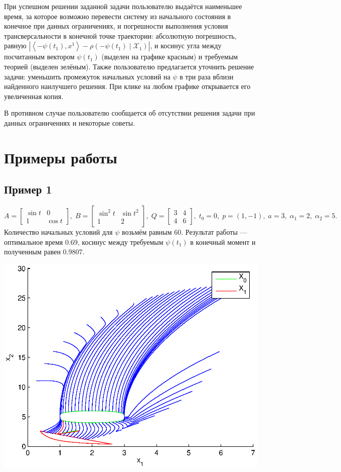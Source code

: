 \documentclass[11pt]{article}
\newcommand\abs[1]{\left\lvert#1\right\rvert}
\newcommand{\scalar}[2]{\left<#1,#2\right>}
\begin{document}
При успешном решении заданной задачи пользователю выдаётся наименьшее время, за которое возможно перевести систему из начального состояния в конечное при данных ограничениях, и погрешности выполнения условия трансверсальности в конечной точке траектории: абсолютную погрешность, равную $\abs{\scalar{-\psi(t_1)}{x^1} - \rho(-\psi(t_1) \mid \mathcal{X}_1)}$, и косинус угла между посчитанным вектором $\psi(t_1)$ (выделен на графике красным) и требуемым теорией (выделен зелёным). Также пользователю предлагается уточнить решение задачи: уменьшить промежуток начальных условий на $\psi$ в три раза вблизи найденного наилучшего решения. При клике на любом графике открывается его увеличенная копия.

В противном случае пользователю сообщается об отсутствии решения задачи при данных ограничениях и некоторые советы.
\section{Примеры работы}
\subsection{Пример 1}
$$
A = \left[
\begin{matrix}
\sin t & 0 \\
1 & \cos t
\end{matrix}
\right], \;
B = \left[
\begin{matrix}
\sin^2 t & \sin t^2\\
1 & 2
\end{matrix}
\right], \;
Q = \left[
\begin{matrix}
3 & 4 \\
4 & 6
\end{matrix}
\right], \;
t_0 = 0, \; p = \left( 1, -1 \right), \; a = 3, \; \alpha_1 = 2, \; \alpha_2 = 5.
$$
Количество начальных условий для $\psi$ возьмём равным 60. Результат работы --- оптимальное время 0.69, косинус между требуемым $\psi(t_1)$ в конечный момент и полученным равен 0.9807.

\includegraphics[scale=1]{pics/pic1_x.eps}
\end{document}
